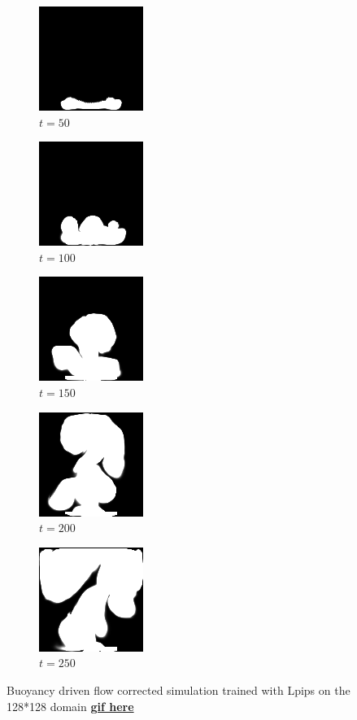 \documentclass[a4paper,12pt,twoside]{report}
\begin{document}
\begin{figure}
	\centering
	\begin{subfigure}{0.18\textwidth}
		\centering
		\includegraphics[scale=0.56]{buoyancy_test/dens_000050_lpips.png}
		\caption{$t=50$}
	\end{subfigure}
	\begin{subfigure}{0.18\textwidth}
		\centering
		\includegraphics[scale=0.56]{buoyancy_test/dens_000100_lpips.png}
		\caption{$t=100$}
	\end{subfigure}
	\begin{subfigure}{0.18\textwidth}
		\centering
		\includegraphics[scale=0.56]{buoyancy_test/dens_000150_lpips.png}
		\caption{$t=150$}
	\end{subfigure}
	\begin{subfigure}{0.18\textwidth}
		\centering
		\includegraphics[scale=0.56]{buoyancy_test/dens_000200_lpips.png}
		\caption{$t=200$}
	\end{subfigure}
	\begin{subfigure}{0.18\textwidth}
		\centering
		\includegraphics[scale=0.56]{buoyancy_test/dens_000249_lpips.png}
		\caption{$t=250$}
	\end{subfigure}
	\caption{Buoyancy driven flow corrected simulation trained with Lpips on the 128*128 domain \href{https://github.com/w191444052/sol-data/blob/master/buoyancy_high/lpips.gif}{\bf{gif here}}}
	\label{sol buoyancy high lpips}
\end{figure}
\end{document}
